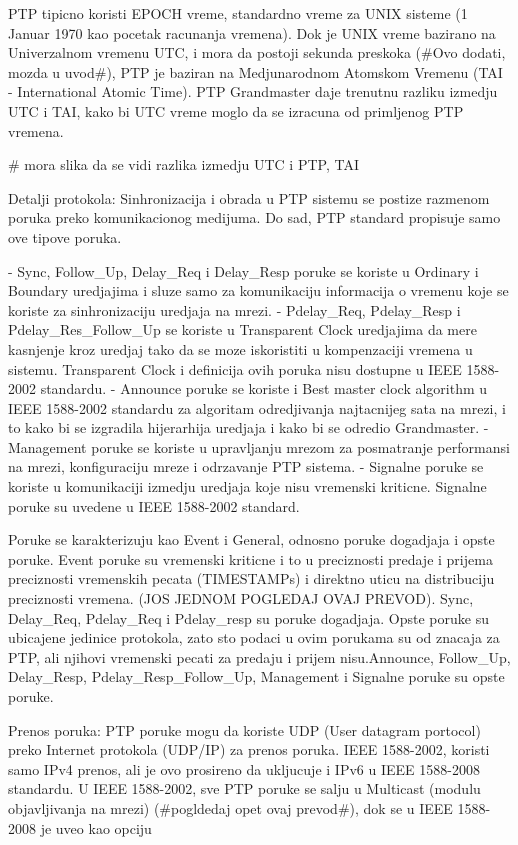 \documentclass[a4paper,12pt, master]{etf}
\begin{document}
	PTP tipicno koristi EPOCH vreme, standardno vreme za UNIX sisteme (1 Januar 1970 kao pocetak
	racunanja vremena). Dok je UNIX vreme bazirano na Univerzalnom vremenu UTC, i mora da postoji
	sekunda preskoka (\#Ovo dodati, mozda u uvod\#), PTP je baziran na Medjunarodnom Atomskom Vremenu
	(TAI - International Atomic Time). PTP Grandmaster daje trenutnu razliku izmedju UTC i TAI,
	kako bi UTC vreme moglo da se izracuna od primljenog PTP vremena.

	\# mora slika da se vidi razlika izmedju UTC i PTP, TAI

	Detalji protokola:
	Sinhronizacija i obrada u PTP sistemu se postize razmenom poruka preko komunikacionog medijuma.
	Do sad, PTP standard propisuje samo ove tipove poruka.

	- Sync, Follow\_Up, Delay\_Req i Delay\_Resp poruke se koriste u Ordinary i Boundary uredjajima i
	sluze samo za komunikaciju informacija o vremenu koje se koriste za sinhronizaciju uredjaja na
	mrezi.
	- Pdelay\_Req, Pdelay\_Resp i Pdelay\_Res\_Follow\_Up se koriste u Transparent Clock uredjajima da
	mere kasnjenje kroz uredjaj tako da se moze iskoristiti u kompenzaciji vremena u sistemu.
	Transparent Clock i definicija ovih poruka nisu dostupne u IEEE 1588-2002 standardu.
	- Announce poruke se koriste i Best master clock algorithm u IEEE 1588-2002 standardu za
	algoritam odredjivanja najtacnijeg sata na mrezi, i to kako bi se izgradila hijerarhija
	uredjaja i kako bi se odredio Grandmaster.
	- Management poruke se koriste u upravljanju mrezom za posmatranje performansi na mrezi,
	konfiguraciju mreze i odrzavanje PTP sistema.
	- Signalne poruke se koriste u komunikaciji izmedju uredjaja koje nisu vremenski kriticne.
	Signalne poruke su uvedene u IEEE 1588-2002 standard.

	Poruke se karakterizuju kao Event i General, odnosno poruke dogadjaja i opste poruke. Event
	poruke su vremenski kriticne i to u preciznosti predaje i prijema preciznosti vremenskih pecata
	(TIMESTAMPs) i direktno uticu na distribuciju preciznosti vremena. (JOS JEDNOM POGLEDAJ OVAJ
	PREVOD). Sync, Delay\_Req, Pdelay\_Req i Pdelay\_resp su poruke dogadjaja. Opste poruke su
	ubicajene jedinice protokola, zato sto podaci u ovim porukama su od znacaja za PTP, ali njihovi
	vremenski pecati za predaju i prijem nisu.Announce, Follow\_Up, Delay\_Resp,
	Pdelay\_Resp\_Follow\_Up, Management i Signalne poruke su opste poruke.

	Prenos poruka:
	PTP poruke mogu da koriste UDP (User datagram portocol) preko Internet protokola (UDP/IP) za
	prenos poruka. IEEE 1588-2002, koristi samo IPv4 prenos, ali je ovo prosireno da ukljucuje i
	IPv6 u IEEE 1588-2008 standardu. U IEEE 1588-2002, sve PTP poruke se salju u Multicast (modulu
	objavljivanja na mrezi) (\#pogldedaj opet ovaj prevod\#), dok se u IEEE 1588-2008 je uveo kao
	opciju
\end{document}
